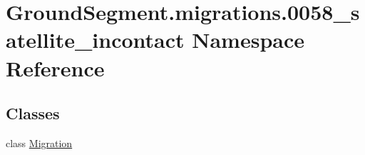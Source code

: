 \hypertarget{namespace_ground_segment_1_1migrations_1_10058__satellite__incontact}{}\section{Ground\+Segment.\+migrations.0058\+\_\+satellite\+\_\+incontact Namespace Reference}
\label{namespace_ground_segment_1_1migrations_1_10058__satellite__incontact}
\subsection*{Classes}
\begin{DoxyCompactItemize}
\item 
class \hyperlink{class_ground_segment_1_1migrations_1_10058__satellite__incontact_1_1_migration}{Migration}
\end{DoxyCompactItemize}
